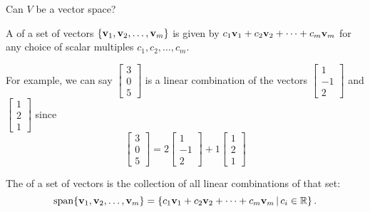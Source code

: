 \begin{applicationActivities}
\begin{activity}{15}
  \begin{subactivity}
    Can \(V\) be a vector space?
  \end{subactivity}
\end{activity}

\begin{definition}
  A  of a set of vectors
  \(\{\mathbf v_1,\mathbf v_2,\dots,\mathbf v_m\}\) is given by
  \(c_1\mathbf v_1+c_2\mathbf v_2+\dots+c_m\mathbf v_m\) for any choice of
  scalar multiples \(c_1,c_2,\dots,c_m\).

	\vspace{2em}

  For example, we can say $\begin{bmatrix}3 \\0 \\ 5\end{bmatrix}$ is a linear combination of the vectors $\begin{bmatrix} 1 \\ -1 \\ 2 \end{bmatrix}$ and $\begin{bmatrix} 1 \\ 2 \\ 1 \end{bmatrix}$ since $$\begin{bmatrix} 3 \\ 0 \\ 5 \end{bmatrix} = 2 \begin{bmatrix} 1 \\ -1 \\ 2 \end{bmatrix} + 1\begin{bmatrix} 1 \\ 2 \\ 1 \end{bmatrix}$$
\end{definition}

\begin{definition}
  The  of a set of vectors is the collection of all linear
  combinations of that set:
  \[
    \operatorname{span}\{\mathbf v_1,\mathbf v_2,\dots,\mathbf v_m\} =
    \left\{c_1\mathbf v_1+c_2\mathbf v_2+\dots+c_m\mathbf v_m\,\middle|\,
    c_i\in\mathbb{R}\right\}.
  \]
\end{definition}


\end{applicationActivities}
